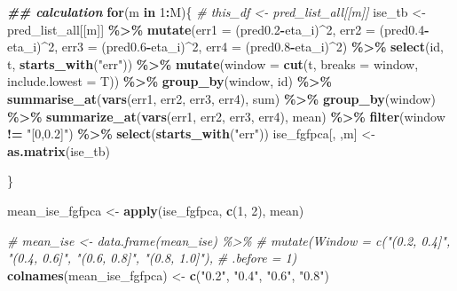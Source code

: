 \documentclass[
]{article}
\newenvironment{Shaded}{\begin{snugshade}}{\end{snugshade}}
\newcommand{\AttributeTok}[1]{\textcolor[rgb]{0.13,0.29,0.53}{#1}}
\newcommand{\CommentTok}[1]{\textcolor[rgb]{0.56,0.35,0.01}{\textit{#1}}}
\newcommand{\ControlFlowTok}[1]{\textcolor[rgb]{0.13,0.29,0.53}{\textbf{#1}}}
\newcommand{\DecValTok}[1]{\textcolor[rgb]{0.00,0.00,0.81}{#1}}
\newcommand{\DocumentationTok}[1]{\textcolor[rgb]{0.56,0.35,0.01}{\textbf{\textit{#1}}}}
\newcommand{\FloatTok}[1]{\textcolor[rgb]{0.00,0.00,0.81}{#1}}
\newcommand{\FunctionTok}[1]{\textcolor[rgb]{0.13,0.29,0.53}{\textbf{#1}}}
\newcommand{\NormalTok}[1]{#1}
\newcommand{\OtherTok}[1]{\textcolor[rgb]{0.56,0.35,0.01}{#1}}
\newcommand{\SpecialCharTok}[1]{\textcolor[rgb]{0.81,0.36,0.00}{\textbf{#1}}}
\newcommand{\StringTok}[1]{\textcolor[rgb]{0.31,0.60,0.02}{#1}}
\begin{document}
\begin{Shaded}
\begin{Highlighting}[]
\DocumentationTok{\#\# calculation}
\ControlFlowTok{for}\NormalTok{(m }\ControlFlowTok{in} \DecValTok{1}\SpecialCharTok{:}\NormalTok{M)\{}
  \CommentTok{\# this\_df \textless{}{-} pred\_list\_all[[m]]}
\NormalTok{  ise\_tb }\OtherTok{\textless{}{-}}\NormalTok{ pred\_list\_all[[m]] }\SpecialCharTok{\%\textgreater{}\%}
    \FunctionTok{mutate}\NormalTok{(}\AttributeTok{err1 =}\NormalTok{ (pred0}\FloatTok{.2}\SpecialCharTok{{-}}\NormalTok{eta\_i)}\SpecialCharTok{\^{}}\DecValTok{2}\NormalTok{,}
           \AttributeTok{err2 =}\NormalTok{ (pred0}\FloatTok{.4}\SpecialCharTok{{-}}\NormalTok{eta\_i)}\SpecialCharTok{\^{}}\DecValTok{2}\NormalTok{,}
           \AttributeTok{err3 =}\NormalTok{ (pred0}\FloatTok{.6}\SpecialCharTok{{-}}\NormalTok{eta\_i)}\SpecialCharTok{\^{}}\DecValTok{2}\NormalTok{,}
           \AttributeTok{err4 =}\NormalTok{ (pred0}\FloatTok{.8}\SpecialCharTok{{-}}\NormalTok{eta\_i)}\SpecialCharTok{\^{}}\DecValTok{2}\NormalTok{) }\SpecialCharTok{\%\textgreater{}\%}
    \FunctionTok{select}\NormalTok{(id, t, }\FunctionTok{starts\_with}\NormalTok{(}\StringTok{"err"}\NormalTok{)) }\SpecialCharTok{\%\textgreater{}\%} 
    \FunctionTok{mutate}\NormalTok{(}\AttributeTok{window =} \FunctionTok{cut}\NormalTok{(t, }\AttributeTok{breaks =}\NormalTok{ window, }\AttributeTok{include.lowest =}\NormalTok{ T)) }\SpecialCharTok{\%\textgreater{}\%} 
    \FunctionTok{group\_by}\NormalTok{(window, id) }\SpecialCharTok{\%\textgreater{}\%} 
    \FunctionTok{summarise\_at}\NormalTok{(}\FunctionTok{vars}\NormalTok{(err1, err2, err3, err4), sum) }\SpecialCharTok{\%\textgreater{}\%} 
    \FunctionTok{group\_by}\NormalTok{(window) }\SpecialCharTok{\%\textgreater{}\%} 
    \FunctionTok{summarize\_at}\NormalTok{(}\FunctionTok{vars}\NormalTok{(err1, err2, err3, err4), mean) }\SpecialCharTok{\%\textgreater{}\%}
    \FunctionTok{filter}\NormalTok{(window }\SpecialCharTok{!=} \StringTok{"[0,0.2]"}\NormalTok{) }\SpecialCharTok{\%\textgreater{}\%} 
    \FunctionTok{select}\NormalTok{(}\FunctionTok{starts\_with}\NormalTok{(}\StringTok{"err"}\NormalTok{))}
\NormalTok{  ise\_fgfpca[, ,m] }\OtherTok{\textless{}{-}} \FunctionTok{as.matrix}\NormalTok{(ise\_tb)}
  
  
\NormalTok{\}}

\NormalTok{mean\_ise\_fgfpca }\OtherTok{\textless{}{-}} \FunctionTok{apply}\NormalTok{(ise\_fgfpca, }\FunctionTok{c}\NormalTok{(}\DecValTok{1}\NormalTok{, }\DecValTok{2}\NormalTok{), mean)}

\CommentTok{\# mean\_ise \textless{}{-} data.frame(mean\_ise) \%\textgreater{}\%}
\CommentTok{\#   mutate(Window = c("(0.2, 0.4]", "(0.4, 0.6]", "(0.6, 0.8]", "(0.8, 1.0]"),}
\CommentTok{\#          .before = 1)}
\FunctionTok{colnames}\NormalTok{(mean\_ise\_fgfpca) }\OtherTok{\textless{}{-}} \FunctionTok{c}\NormalTok{(}\StringTok{"0.2"}\NormalTok{, }\StringTok{"0.4"}\NormalTok{, }\StringTok{"0.6"}\NormalTok{, }\StringTok{"0.8"}\NormalTok{)}
\end{Highlighting}
\end{Shaded}
\end{document}
